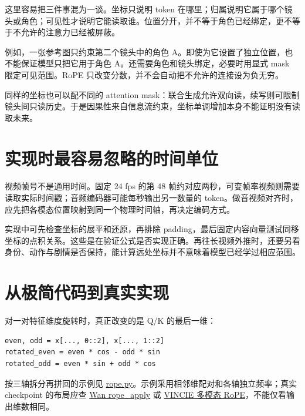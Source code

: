 这里容易把三件事混为一谈。坐标只说明 token 在哪里；归属说明它属于哪个镜头或角色；可见性才说明它能读取谁。位置分开，并不等于角色已经绑定，更不等于不允许的注意力已经被屏蔽。

例如，一张参考图只约束第二个镜头中的角色 A。即使为它设置了独立位置，也不能保证模型只把它用于角色 A。还需要角色和镜头绑定，必要时用显式 mask 限定可见范围。RoPE 只改变分数，并不会自动把不允许的连接设为负无穷。

同样的坐标也可以配不同的 attention mask：联合生成允许双向读，续写则可限制镜头间只读历史。于是因果性来自信息流约束，坐标单调增加本身不能证明没有读取未来。

\section{实现时最容易忽略的时间单位}\label{seedance-m04-ux5b9eux73b0ux65f6ux6700ux5bb9ux6613ux5ffdux7565ux7684ux65f6ux95f4ux5355ux4f4d}

视频帧号不是通用时间。固定 24 fps 的第 48 帧约对应两秒，可变帧率视频则需要读取实际时间戳；音频编码器可能每秒输出另一数量的 token。做音视频对齐时，应先把各模态位置映射到同一个物理时间轴，再决定编码方式。

实现中可先检查坐标的展平和还原，再排除 padding，最后固定内容向量测试同移坐标的点积关系。这些是在验证公式是否实现正确。再往长视频外推时，还要另看身份、动作与剧情是否保持，能计算远处坐标并不意味着模型已经学过相应范围。

\section{从极简代码到真实实现}\label{seedance-m04-ux4eceux6781ux7b80ux4ee3ux7801ux5230ux771fux5b9eux5b9eux73b0}

对一对特征维度旋转时，真正改变的是 Q/K 的最后一维：

\begin{verbatim}
even, odd = x[..., 0::2], x[..., 1::2]
rotated_even = even * cos - odd * sin
rotated_odd = even * sin + odd * cos
\end{verbatim}

按三轴拆分再拼回的示例见 \hyperref[code-rope]{rope.py}。示例采用相邻维配对和各轴独立频率；真实 checkpoint 的布局应查 \href{https://github.com/Wan-Video/Wan2.1/blob/9737cba9c1c3c4d04b33fcad41c111989865d315/wan/modules/model.py}{Wan rope\_apply} 或 \href{https://github.com/ByteDance-Seed/VINCIE/blob/97cd2c5701e694dabcfea320c0cf59893d427fab/models/dit/rope.py}{VINCIE 多模态 RoPE}，不能仅看输出维数相同。

